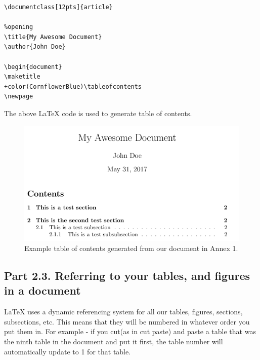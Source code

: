 \documentclass[12pts]{report}
\begin{document}
\begin{multicols}{2}
	
\begin{Verbatim}[commandchars=+\(\)]
\documentclass[12pts]{article}

%opening
\title{My Awesome Document}
\author{John Doe}

\begin{document}
\maketitle
+color(CornflowerBlue)\tableofcontents
\newpage

\end{Verbatim}
The above {\LaTeX} code is used to generate table of contents.

\columnbreak
\begin{figure} [H]
	\centering
	\includegraphics[width=1\linewidth]{../img/tableofcontents2}
	\caption{Example table of contents generated from our document in Annex 1.}
	\label{fig:tableofcontents}
\end{figure}
\end{multicols}

\subsection*{Part 2.3. Referring to your tables, and figures in a document}

{\LaTeX} uses a dynamic referencing system for all our tables, figures, sections, subsections, etc. This means that they will be numbered in whatever order you put them in. For example - if you cut(as in cut paste) and paste a table that was the ninth table in the document and put it first, the table number will automatically update to 1 for that table. \\
\end{document}
